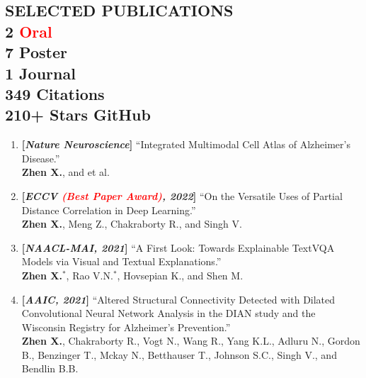 \documentclass[margin]{res}
\begin{document}
\begin{resume}
\section{SELECTED PUBLICATIONS \\ \small{ 2 {\textcolor{red}{Oral}}\\ 7 Poster\\ 1 Journal \\ 349 Citations \\ 210+ Stars GitHub}  }
                \begin{enumerate}[noitemsep,wide=0pt,leftmargin=\dimexpr\labelwidth + 2\labelsep\relax]\itemsep -0.0pt
                \item \textbf{[\emph{Nature Neuroscience}]} ``Integrated Multimodal Cell Atlas of Alzheimer's Disease.''\\
                				\textbf{Zhen X.}, and et al.
                \item \textbf{[\emph{ECCV \textcolor{red}{(Best Paper Award)}, 2022}]} ``On the Versatile Uses of Partial Distance Correlation in Deep Learning.''\\
                            \textbf{Zhen X.}, Meng Z., Chakraborty R., and Singh V.
                \item \textbf{[\emph{NAACL-MAI, 2021}]} ``A First Look: Towards Explainable TextVQA Models via Visual and Textual Explanations.''\\
                            \textbf{Zhen X.}$^*$, Rao V.N.$^*$, Hovsepian K., and Shen M.
                \item \textbf{[\emph{AAIC, 2021}]} ``Altered Structural Connectivity Detected with Dilated Convolutional Neural Network Analysis in the DIAN study and the Wisconsin Registry for Alzheimer's Prevention.''\\
                            \textbf{Zhen X.}, Chakraborty R., Vogt N., Wang R., Yang K.L., Adluru N., Gordon B., Benzinger T., Mckay N., Betthauser T., Johnson S.C., Singh V., and Bendlin B.B.

\end{enumerate}
\end{resume}
\end{document}
